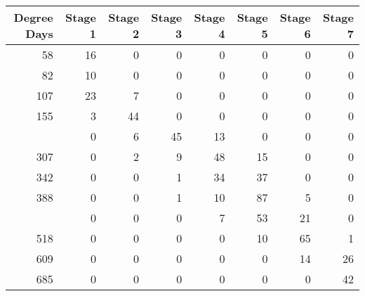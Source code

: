 
\begin{tabular}{rrrrrrrr}
\toprule
Degree Days & Stage 1 & Stage 2 & Stage 3 & Stage 4 & Stage 5 & Stage 6 & Stage 7\\
\midrule
58 & 16 & 0 & 0 & 0 & 0 & 0 & 0\\
82 & 10 & 0 & 0 & 0 & 0 & 0 & 0\\
107 & 23 & 7 & 0 & 0 & 0 & 0 & 0\\
155 & 3 & 44 & 0 & 0 & 0 & 0 & 0\\
\addlinespace
237 & 0 & 6 & 45 & 13 & 0 & 0 & 0\\
307 & 0 & 2 & 9 & 48 & 15 & 0 & 0\\
342 & 0 & 0 & 1 & 34 & 37 & 0 & 0\\
388 & 0 & 0 & 1 & 10 & 87 & 5 & 0\\
\addlinespace
442 & 0 & 0 & 0 & 7 & 53 & 21 & 0\\
518 & 0 & 0 & 0 & 0 & 10 & 65 & 1\\
609 & 0 & 0 & 0 & 0 & 0 & 14 & 26\\
685 & 0 & 0 & 0 & 0 & 0 & 0 & 42\\
\bottomrule
\end{tabular}